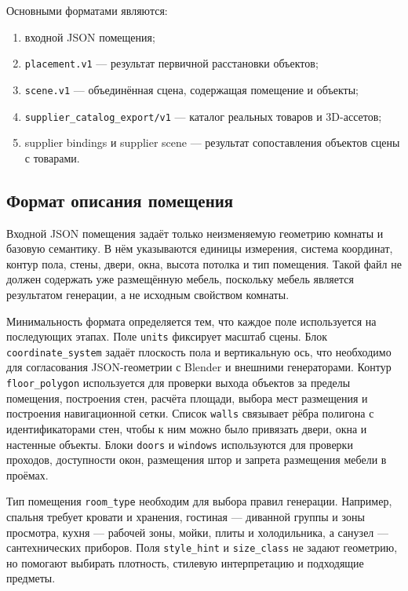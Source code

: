 \documentclass[times]{itmo-student-thesis}
\begin{document}
Основными форматами являются:
\begin{enumerate}
  \item входной JSON помещения;
  \item \texttt{placement.v1} --- результат первичной расстановки объектов;
  \item \texttt{scene.v1} --- объединённая сцена, содержащая помещение и объекты;
  \item \texttt{supplier\_catalog\_export/v1} --- каталог реальных товаров и 3D-ассетов;
  \item supplier bindings и supplier scene --- результат сопоставления объектов сцены с товарами.
\end{enumerate}

\subsection{Формат описания помещения}

Входной JSON помещения задаёт только неизменяемую геометрию комнаты и базовую семантику. В нём указываются единицы измерения, система координат, контур пола, стены, двери, окна, высота потолка и тип помещения. Такой файл не должен содержать уже размещённую мебель, поскольку мебель является результатом генерации, а не исходным свойством комнаты.

Минимальность формата определяется тем, что каждое поле используется на последующих этапах. Поле \texttt{units} фиксирует масштаб сцены. Блок \texttt{coordinate\_system} задаёт плоскость пола и вертикальную ось, что необходимо для согласования JSON-геометрии с Blender и внешними генераторами. Контур \texttt{floor\_polygon} используется для проверки выхода объектов за пределы помещения, построения стен, расчёта площади, выбора мест размещения и построения навигационной сетки. Список \texttt{walls} связывает рёбра полигона с идентификаторами стен, чтобы к ним можно было привязать двери, окна и настенные объекты. Блоки \texttt{doors} и \texttt{windows} используются для проверки проходов, доступности окон, размещения штор и запрета размещения мебели в проёмах.

Тип помещения \texttt{room\_type} необходим для выбора правил генерации. Например, спальня требует кровати и хранения, гостиная --- диванной группы и зоны просмотра, кухня --- рабочей зоны, мойки, плиты и холодильника, а санузел --- сантехнических приборов. Поля \texttt{style\_hint} и \texttt{size\_class} не задают геометрию, но помогают выбирать плотность, стилевую интерпретацию и подходящие предметы.
\end{document}
